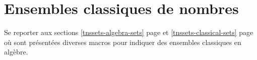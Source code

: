 \documentclass[12pt,a4paper]{article}
\begin{document}
\section{Ensembles classiques de nombres}

Se reporter aux sections
\ref{tnssets-algebra-sets} page \pageref{tnssets-algebra-sets}
et
\ref{tnssets-classical-sets} page \pageref{tnssets-classical-sets}
où sont présentées diverses macros pour indiquer des ensembles classiques en algèbre.
\end{document}
